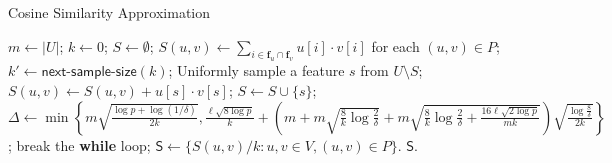 \documentclass{article}
\begin{document}
\begin{algorithm}[!t]
\caption{\textsf{Cosine Similarity Approximation}}
\label{alg:csa}
\renewcommand{\algorithmicrequire}{\textbf{Input:}}
\renewcommand{\algorithmicensure}{\textbf{Output:}}
\begin{algorithmic}
\State $m \gets |U|$; $k \gets 0$; $S \gets \emptyset$;
\State $S(u,v) \gets \sum_{i\in \mathbf{f}_u \cap \mathbf{f}_v} u[i] \cdot v[i]$ for each $(u, v) \in P$;
	\State $k' \gets \textsf{next-sample-size}(k)$;
		\State Uniformly sample a feature $s$ from $U\setminus S$;
				\State $S(u,v) \gets S(u,v)+u[s]\cdot v[s]$;
			\EndIf
		\EndFor
		\State $S \gets S\cup \{s\}$;
	\EndFor
	\State $\Delta \gets \min\left\{m\sqrt{\frac{\log p + \log(1/\delta)}{2k}}, \frac{\ell\sqrt{8\log p}}{k} +\left(m+m\sqrt{\frac{8}{k}\log \frac{2}{\delta}} + m\sqrt{\frac{8}{k}\log \frac{2}{\delta} + \frac{16\ell\sqrt{2\log p}}{mk}}\right)\sqrt{\frac{\log \frac{8}{\delta}}{2k}}\right\}$;
	\If {$\Delta \leq \epsilon$}
		\State break the {\bf while} loop;
	\EndIf
\EndWhile
\State $\mathsf{S} \gets \{S(u,v)/k : u,v\in V, (u,v)\in P\}$.
 $\mathsf{S}$.
\end{algorithmic}
\end{algorithm}
\end{document}
